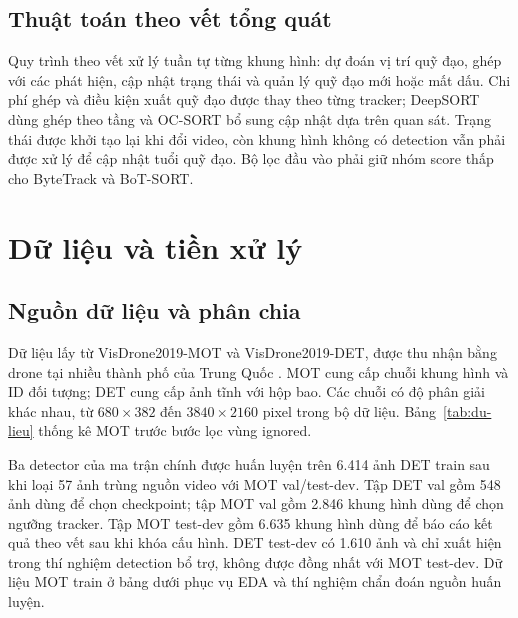 \documentclass[fontsize=13pt,a4paper,oneside,parskip=false,numbers=noenddot,bibliography=totoc]{scrreprt}
\begin{document}
\subsection{Thuật toán theo vết tổng quát}
\label{sec:pseudo}

Quy trình theo vết xử lý tuần tự từng khung hình: dự đoán vị trí quỹ đạo, ghép với các phát hiện, cập nhật trạng thái và quản lý quỹ đạo mới hoặc mất dấu. Chi phí ghép và điều kiện xuất quỹ đạo được thay theo từng tracker; DeepSORT dùng ghép theo tầng và OC-SORT bổ sung cập nhật dựa trên quan sát. Trạng thái được khởi tạo lại khi đổi video, còn khung hình không có detection vẫn phải được xử lý để cập nhật tuổi quỹ đạo. Bộ lọc đầu vào phải giữ nhóm score thấp cho ByteTrack và BoT-SORT.



\section{Dữ liệu và tiền xử lý}
\label{sec:du-lieu}

\subsection{Nguồn dữ liệu và phân chia}

Dữ liệu lấy từ VisDrone2019-MOT và VisDrone2019-DET, được thu nhận bằng drone tại nhiều thành phố của Trung Quốc \cite{zhu2022visdrone,wen2019visdronemot}. MOT cung cấp chuỗi khung hình và ID đối tượng; DET cung cấp ảnh tĩnh với hộp bao. Các chuỗi có độ phân giải khác nhau, từ $680\times382$ đến $3840\times2160$ pixel trong bộ dữ liệu. Bảng~\ref{tab:du-lieu} thống kê MOT trước bước lọc vùng ignored.

Ba detector của ma trận chính được huấn luyện trên 6.414 ảnh DET train sau khi loại 57 ảnh trùng nguồn video với MOT val/test-dev. Tập DET val gồm 548 ảnh dùng để chọn checkpoint; tập MOT val gồm 2.846 khung hình dùng để chọn ngưỡng tracker. Tập MOT test-dev gồm 6.635 khung hình dùng để báo cáo kết quả theo vết sau khi khóa cấu hình. DET test-dev có 1.610 ảnh và chỉ xuất hiện trong thí nghiệm detection bổ trợ, không được đồng nhất với MOT test-dev. Dữ liệu MOT train ở bảng dưới phục vụ EDA và thí nghiệm chẩn đoán nguồn huấn luyện.
\end{document}
